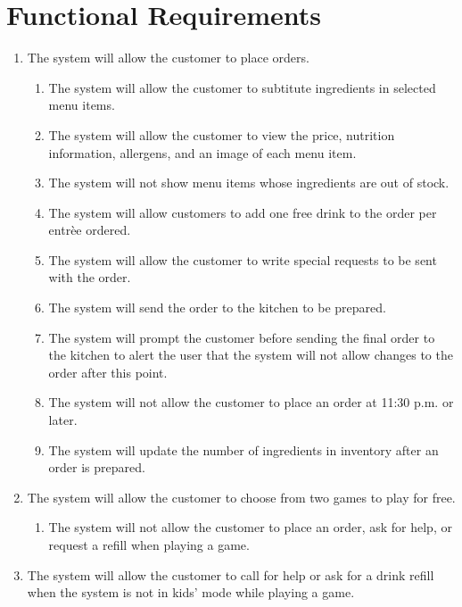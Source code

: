 \documentclass[12pt]{article}
\begin{document}
	\section{Functional Requirements}
		\begin{enumerate}
			\item The system will allow the customer to place orders.
			\begin{enumerate}
				\item The system will allow the customer to subtitute ingredients in selected menu items.
				\item The system will allow the customer to view the price, nutrition information, allergens, and an image of each menu item.
				\item The system will not show menu items whose ingredients are out of stock.
				\item The system will allow customers to add one free drink to the order per entr\`ee ordered.
				\item The system will allow the customer to write special requests to be sent with the order.
				\item The system will send the order to the kitchen to be prepared.
				\item The system will prompt the customer before sending the final order to the kitchen to alert the user that the system will not allow changes to the order after this point.
				\item The system will not allow the customer to place an order at 11:30 p.m. or later.
				\item The system will update the number of ingredients in inventory after an order is prepared.
			\end{enumerate}

			\item The system will allow the customer to choose from two games to play for free.
				\begin{enumerate}
					\item The system will not allow the customer to place an order, ask for help, or request a refill when playing a game.
				\end{enumerate}

			\item The system will allow the customer to call for help or ask for a drink refill when the system is not in kids' mode while playing a game.


\end{enumerate}
\end{document}
